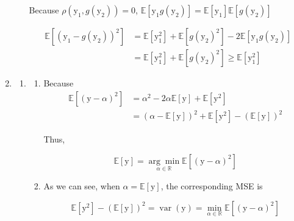 \documentclass[a4paper]{article}
\begin{document}
\begin{enumerate}
\begin{enumerate}
  Because $\rho(\mathrm{y}_1,g(\mathrm{y}_2)) = 0$, $\mathbb{E}\left[\mathrm{y}_{1}g(\mathrm{y}_{2})\right] = \mathbb{E}\left[\mathrm{y}_{1}\right] \mathbb{E}\left[g(\mathrm{y}_2)\right]$

  \begin{equation}
    \begin{aligned}
      \mathbb{E}\left[\left(\mathrm{y}_{1}-g\left(\mathrm{y}_{2}\right)\right)^{2}\right] & =   \mathbb{E}\left[\mathrm{y}_{1}^2\right] + \mathbb{E}\left[g(\mathrm{y}_{2})^{2}\right] - 2 \mathbb{E}\left[\mathrm{y}_{1}g(\mathrm{y}_{2})\right] \\
      & = \mathbb{E}\left[\mathrm{y}_{1}^2\right] + \mathbb{E}\left[g(\mathrm{y}_{2})^{2}\right] \geqslant \mathbb{E}\left[\mathrm{y}_1^2\right]
    \end{aligned}
  \end{equation}
\end{enumerate}

\item \begin{enumerate}
  \item \begin{enumerate}
    \item Because \begin{equation}
      \begin{aligned}
        \mathbb{E}\left[(\mathrm{y}-
        \alpha)^2\right]  &= \alpha^2  -2 \alpha \mathbb{E}[\mathrm{y}] +  \mathbb{E}[\mathrm{y}^2]  \\
        & = (\alpha-\mathbb{E}[\mathrm{y}])^2 +  \mathbb{E}[\mathrm{y}^2] - \left(\mathbb{E}[\mathrm{y}]\right)^2
      \end{aligned}
    \end{equation}

    Thus,

    \begin{equation}
      \mathbb{E}[\mathrm{y}]=\underset{\alpha \in \mathbb{R}}{\arg \min } \mathbb{E}\left[(\mathrm{y}-\alpha)^{2}\right]
    \end{equation}

    \item As we can see, when $\alpha = \mathbb{E}[\mathrm{y}]$, the corresponding MSE is
    
    \begin{equation}
      \mathbb{E}[\mathrm{y}^2] - \left(\mathbb{E}[\mathrm{y}]\right)^2 = \operatorname{var}(\mathrm{y}) =  \min_{\alpha \in \mathbb{R}} \mathbb{E}\left[(\mathrm{y}-\alpha)^{2}\right]
    \end{equation}
  \end{enumerate}


\end{enumerate}
\end{enumerate}
\end{document}
